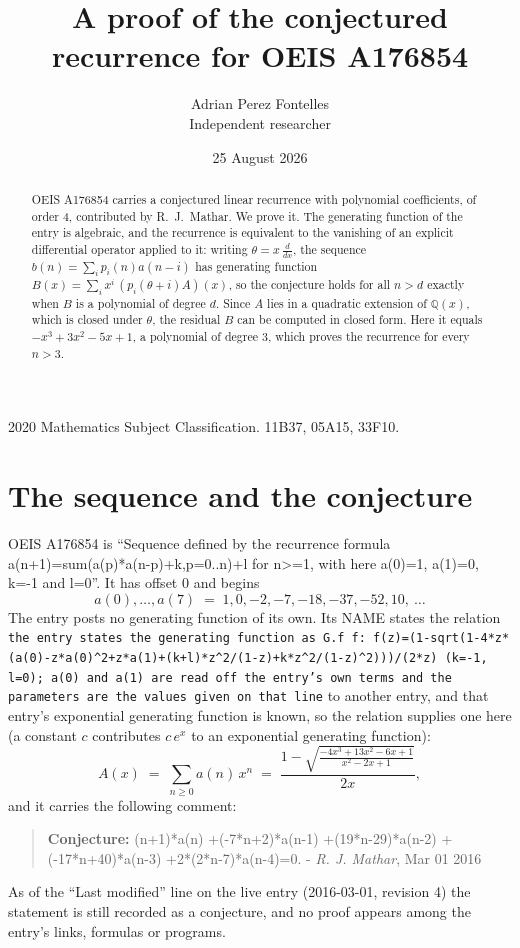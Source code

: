 \documentclass[11pt,a4paper]{article}
\title{A proof of the conjectured recurrence for OEIS A176854}
\author{Adrian Perez Fontelles\\ \small Independent researcher}
\date{25 August 2026}
\theoremstyle{plain}
\theoremstyle{definition}
\begin{document}
\maketitle

\begin{abstract}
OEIS A176854 carries a conjectured linear recurrence with polynomial coefficients, of
order 4, contributed by R.~J.~Mathar. We prove it. The generating function of the
entry is algebraic, and the recurrence is equivalent to the vanishing of an explicit
differential operator applied to it: writing $\theta=x\,\frac{d}{dx}$, the sequence
$b(n)=\sum_{i}p_{i}(n)a(n-i)$ has generating function
$B(x)=\sum_{i}x^{i}\,(p_{i}(\theta+i)A)(x)$, so the conjecture holds for all $n>d$ exactly
when $B$ is a polynomial of degree $d$. Since $A$ lies in a quadratic extension of
$\mathbb{Q}(x)$, which is closed under $\theta$, the residual $B$ can be computed in
closed form. Here it equals $- x^{3} + 3 x^{2} - 5 x + 1$, a polynomial of degree $3$, which proves
the recurrence for every $n>3$.
\end{abstract}

\noindent\small 2020 Mathematics Subject Classification. 11B37, 05A15, 33F10.\normalsize

\section{The sequence and the conjecture}

OEIS A176854 is ``Sequence defined by the recurrence formula a(n+1)=sum(a(p)*a(n-p)+k,p=0..n)+l for n>=1, with here a(0)=1, a(1)=0, k=-1 and l=0''. It has offset $0$ and begins
\[
a(0),\dots,a(7)\;=\;1, 0, -2, -7, -18, -37, -52, 10,\ \dots
\]
The entry posts no generating function of its own. Its NAME states the
relation \texttt{the entry states the generating function as G.f f: f(z)=(1-sqrt(1-4*z*(a(0)-z*a(0)\textasciicircum{}2+z*a(1)+(k+l)*z\textasciicircum{}2/(1-z)+k*z\textasciicircum{}2/(1-z)\textasciicircum{}2)))/(2*z) (k=-1, l=0); a(0) and a(1) are read off the entry's own terms and the parameters are the values given on that line} to another entry, and that entry's exponential generating
function is known, so the relation supplies one here (a constant $c$ contributes
$c\,e^{x}$ to an exponential generating function):
\begin{equation}\label{eq:gf}
A(x)\;=\;\sum_{n\ge 0} a(n)\,x^{n}\;=\;\frac{1 - \sqrt{\frac{- 4 x^{3} + 13 x^{2} - 6 x + 1}{x^{2} - 2 x + 1}}}{2 x} ,
\end{equation}
and it carries the following comment:
\begin{quote}\small
\textbf{Conjecture:} (n+1)*a(n) +(-7*n+2)*a(n-1) +(19*n-29)*a(n-2) +(-17*n+40)*a(n-3) +2*(2*n-7)*a(n-4)=0. - \emph{R. J. Mathar}, Mar 01 2016
\end{quote}
As of the ``Last modified'' line on the live entry (2016-03-01, revision 4) the
statement is still recorded as a conjecture, and no proof appears among the entry's links,
formulas or programs.
\end{document}

